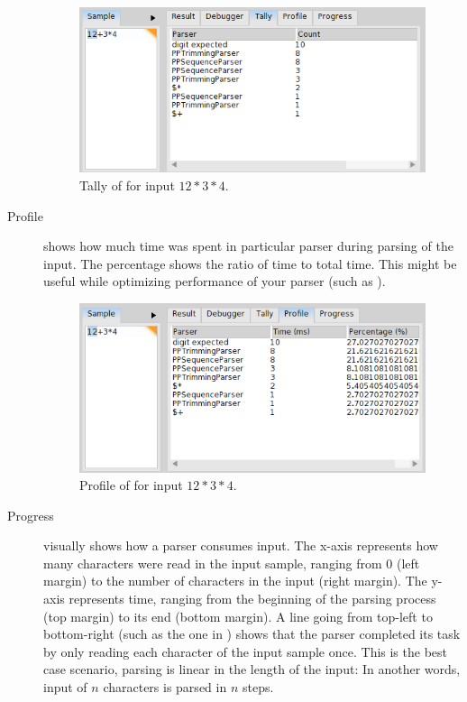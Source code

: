 \documentclass[a4paper,10pt,twoside]{book}
\begin{document}
\begin{description}
\begin{figure}[ht]
  \begin{center}
    \includegraphics[width=.8\linewidth]{tally}
    \caption{Tally of  for input $12*3*4$. \label{fig:pp/tally}}
  \end{center}
\end{figure}
    
\item[Profile] shows how much time was spent in particular parser
  during parsing of the input. The percentage shows the ratio of time
  to total time. This might be useful while optimizing performance of
  your parser  (such as  ).
    
\begin{figure}[ht]
  \begin{center}
    \includegraphics[width=.8\linewidth]{profile}
    \caption{Profile of  for input $12*3*4$. \label{fig:pp/profile}}
  \end{center}
\end{figure}
    
\item[Progress] visually shows how a parser consumes input. The x-axis
  represents how many characters were read in the input sample,
  ranging from 0 (left margin) to the number of characters in the
  input (right margin). The y-axis represents time, ranging from the
  beginning of the parsing process (top margin) to its end (bottom
  margin). A line going from top-left to bottom-right (such as the one
  in ) shows that the parser completed its
  task by only reading each character of the input sample once. This
  is the best case scenario, parsing is linear in the length of the
  input: In another words, input of $n$ characters is parsed in $n$
  steps. 


\end{description}
\end{document}
